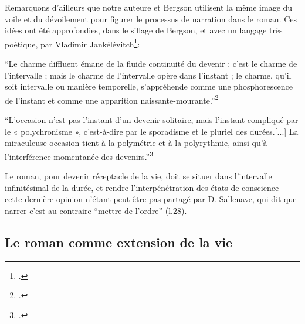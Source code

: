 \documentclass[a4paper,10pt]{article}
\begin{document}
				Remarquons d'ailleurs que notre auteure et Bergson utilisent la même image du voile et du dévoilement pour figurer le processus de narration dans le roman. Ces idées ont été approfondies, dans le sillage de Bergson, et avec un langage très poétique, par Vladimir Jankélévitch\footcite{Jankelevitch1980}:
				\begin{center}
					\footnotesize
					\begin{minipage}{0.7\textwidth}
						``Le charme diffluent émane de la fluide continuité du devenir : c’est le charme de l’intervalle ; mais le charme de l’intervalle opère dans l’instant ; le charme, qu’il soit intervalle ou manière temporelle, s’appréhende comme une phosphorescence de l’instant et comme une apparition naissante-mourante.''\footcite[p.~113]{Jankelevitch1980}
					\end{minipage}
				\end{center}
				\begin{center}
					\footnotesize
					\begin{minipage}{0.7\textwidth}
						``L’occasion n’est pas l’instant d’un devenir solitaire, mais l’instant compliqué par le « polychronisme », c’est-à-dire par le sporadisme et le pluriel des durées.[...] La miraculeuse occasion tient à la polymétrie et à la polyrythmie, ainsi qu’à l’interférence momentanée des devenirs.''\footcite[p.~117]{Jankelevitch1980}
					\end{minipage}
				\end{center}
				Le roman, pour devenir réceptacle de la vie, doit se situer dans l'intervalle infinitésimal de la durée, et rendre l'interpénétration des états de conscience -- cette dernière opinion n'étant peut-être pas partagé par D. Sallenave, qui dit que narrer c'est au contraire ``mettre de l'ordre'' (l.28).
		\subsection{Le roman comme extension de la vie}
\end{document}
